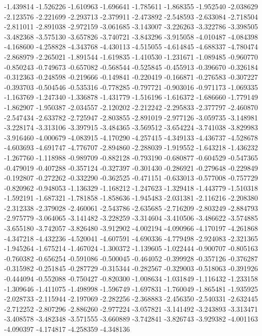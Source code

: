 -1.439814
-1.526226
-1.610963
-1.696641
-1.785611
-1.868355
-1.952540
-2.038629
-2.123576
-2.221699
-2.293713
-2.379911
-2.473892
-2.548593
-2.633084
-2.718504
-2.811011
-2.891038
-2.972159
-3.061685
-3.143007
-3.226263
-3.322786
-3.398505
-3.482368
-3.575130
-3.657826
-3.740721
-3.843296
-3.915058
-4.010487
-4.084398
-4.168600
-4.258828
-4.343768
-4.430113
-4.515055
-4.614845
-4.688337
-4.780474
-2.868979
-2.265021
-1.891544
-1.619835
-1.410530
-1.231671
-1.089485
-0.960770
-0.850243
-0.749673
-0.657082
-0.568544
-0.525845
-0.455913
-0.396670
-0.326184
-0.312363
-0.248598
-0.219666
-0.149841
-0.220419
-0.166871
-0.276583
-0.307227
-0.393703
-0.504546
-0.535316
-0.778285
-0.797721
-0.903016
-0.971173
-1.069335
-1.163769
-1.247340
-1.336878
-1.431779
-1.516196
-1.616372
-1.686660
-1.779149
-1.862907
-1.950387
-2.034557
-2.120202
-2.212242
-2.295833
-2.377797
-2.460870
-2.547434
-2.633782
-2.725947
-2.803855
-2.891019
-2.977126
-3.059735
-3.148981
-3.228174
-3.313106
-3.397915
-3.484365
-3.569512
-3.654224
-3.741038
-3.829983
-3.916460
-4.000679
-4.083915
-4.170290
-4.257415
-4.349133
-4.436737
-4.528678
-4.603693
-4.691747
-4.776707
-2.894860
-2.288039
-1.919552
-1.643218
-1.436232
-1.267760
-1.118988
-0.989709
-0.882128
-0.793190
-0.680877
-0.604529
-0.547365
-0.479019
-0.407288
-0.357124
-0.327397
-0.301430
-0.286921
-0.279648
-0.229849
-0.192807
-0.272262
-0.332290
-0.362525
-0.471151
-0.633013
-0.577008
-0.757729
-0.820962
-0.948053
-1.136329
-1.168212
-1.247623
-1.329418
-1.443779
-1.510318
-1.592191
-1.687321
-1.781858
-1.858636
-1.945483
-2.031381
-2.116216
-2.208380
-2.312338
-2.379028
-2.460061
-2.543786
-2.635685
-2.716209
-2.803249
-2.884793
-2.975779
-3.064065
-3.141482
-3.228259
-3.314604
-3.410506
-3.486622
-3.574885
-3.655180
-3.742057
-3.826480
-3.912902
-4.002194
-4.090966
-4.170197
-4.261868
-4.347218
-4.432236
-4.520041
-4.607591
-4.690336
-4.779498
-2.924083
-2.321365
-1.945264
-1.675214
-1.467024
-1.300372
-1.139605
-1.022444
-0.900707
-0.805163
-0.760382
-0.656254
-0.591086
-0.500045
-0.464052
-0.399928
-0.357126
-0.376287
-0.315982
-0.251845
-0.287729
-0.315344
-0.282567
-0.329003
-0.518063
-0.391926
-0.444094
-0.552088
-0.750427
-0.820300
-1.008634
-1.031849
-1.116432
-1.233158
-1.309646
-1.411075
-1.498998
-1.596749
-1.697831
-1.760049
-1.865481
-1.935925
-2.028733
-2.115944
-2.197069
-2.282256
-2.368883
-2.456350
-2.540331
-2.632445
-2.712252
-2.807296
-2.886260
-2.977224
-3.057821
-3.141492
-3.243893
-3.313471
-3.408578
-3.482348
-3.571555
-3.660889
-3.742841
-3.826743
-3.929382
-4.001163
-4.090397
-4.174817
-4.258359
-4.348136

